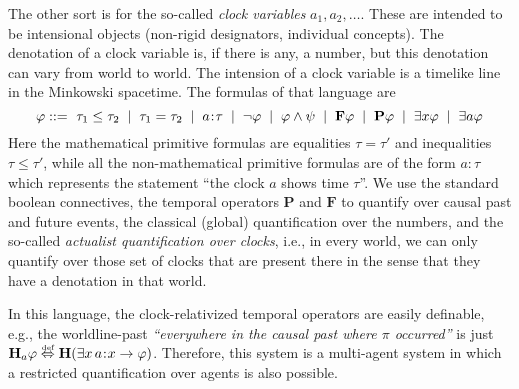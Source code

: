 \documentclass[12pt, a4paper]{article}
\newcommand{\vonal} [1][.2]{\hspace{#1cm} | \hspace{#1cm}}
\newcommand{\defekv}{\overset{\textup{\tiny def}}{ \Leftrightarrow }}
\newcommand{\lthen}{\rightarrow}
\newcommand{\points}[1][0]{\hspace{#1ex}\hspace{-.5ex}:\hspace{-.5ex}\hspace{#1ex}}
\begin{document}
The other sort is for the so-called \emph{clock variables} $a_1, a_2, \dots$. These are intended to be intensional objects (non-rigid designators, individual concepts). The denotation of a clock variable is, if there is any, a number, but this denotation can vary from world to world. The intension of a clock variable is a timelike line in the Minkowski spacetime.
The formulas of that language are 
\[\varphi ::=\, \,  \tau_1 \leq \tau_2 \vonal \tau_1 = \tau_2 \vonal a\points \tau\vonal  \lnot \varphi \vonal \varphi\land \psi \vonal \mathbf F \varphi \vonal \mathbf P \varphi \vonal \exists x \varphi\vonal \exists a \varphi \]
Here the mathematical primitive formulas are equalities $\tau=\tau'$ and inequalities $\tau\leq \tau'$, while all the non-mathematical primitive formulas are of the form $a:\tau$ which represents the statement ``the clock $a$ shows time $\tau$''. We use the standard boolean connectives, the temporal operators $\mathbf P$ and $\mathbf F$ to quantify over causal past and future events, the classical (global) quantification over the numbers, and the so-called \emph{actualist quantification over clocks}, i.e., in every world, we can only quantify over those set of clocks that are present there in the sense that they have a denotation in that world. 

In this language, the clock-relativized temporal operators are easily definable, e.g., the worldline-past \emph{``everywhere in the causal past \emph{where $\pi$ occurred}''} is just $\mathbf H_a \varphi \defekv \mathbf H(\exists x\, a\points x \lthen \varphi)$.
Therefore, this system is a multi-agent system in which a restricted quantification over agents is also possible. 
\end{document}
